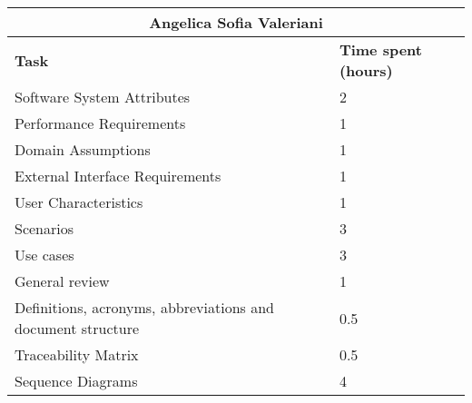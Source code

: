 \begin{table}[ht]
  \center
  \begin{tabular}{l|l}
    \multicolumn{2}{c}{\textbf{Angelica Sofia Valeriani}} \\
    \hline
    \textbf{Task} & \textbf{Time spent (hours)}\\
    \hline
    Software System Attributes & 2 \\
    Performance Requirements & 1 \\
    Domain Assumptions & 1 \\
    External Interface Requirements & 1 \\
    User Characteristics & 1 \\
    Scenarios & 3 \\
    Use cases & 3 \\
    General review & 1 \\
    Definitions, acronyms, abbreviations and document structure & 0.5 \\
    Traceability Matrix & 0.5 \\
    Sequence Diagrams & 4 \\
  \end{tabular}
\end{table}